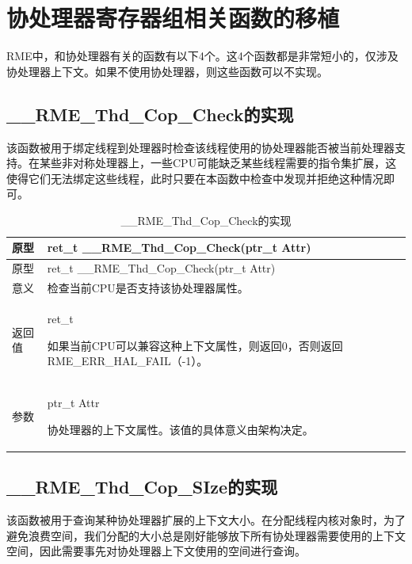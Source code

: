 \section{协处理器寄存器组相关函数的移植}\label{sec:7-coprocessor-register-set-function-porting}

RME中，和协处理器有关的函数有以下4个。这4个函数都是非常短小的，仅涉及协处理器上下文。如果不使用协处理器，则这些函数可以不实现。

\subsection{\_\_RME\_Thd\_Cop\_Check的实现}\label{subsec:7-rme-thd-cop-check-implementation}

该函数被用于绑定线程到处理器时检查该线程使用的协处理器能否被当前处理器支持。在某些非对称处理器上，一些CPU可能缺乏某些线程需要的指令集扩展，这使得它们无法绑定这些线程，此时只要在本函数中检查中发现并拒绝这种情况即可。

\begin{xltabular}{\textwidth}{@{}>{\hsize\raggedright\arraybackslash}X>{\hsize\raggedright\arraybackslash}X@{}}
\caption{\_\_RME\_Thd\_Cop\_Check的实现}\label{tab:7-69-rme-thd-cop-check-implementation}\\
\toprule
原型 & ret\_t \_\_RME\_Thd\_Cop\_Check(ptr\_t Attr)\tabularnewline
\endfirsthead
\toprule
原型 & ret\_t \_\_RME\_Thd\_Cop\_Check(ptr\_t Attr)\tabularnewline
\midrule
\endhead
\bottomrule
\endlastfoot
意义 & 检查当前CPU是否支持该协处理器属性。\tabularnewline
返回值\strut
 & ret\_t

如果当前CPU可以兼容这种上下文属性，则返回0，否则返回 RME\_ERR\_HAL\_FAIL（-1）。\strut
\tabularnewline
参数\strut
 & ptr\_t Attr

协处理器的上下文属性。该值的具体意义由架构决定。\strut
\tabularnewline
\end{xltabular}

\subsection{\_\_RME\_Thd\_Cop\_SIze的实现}\label{subsec:7-rme-thd-cop-size-implementation}

该函数被用于查询某种协处理器扩展的上下文大小。在分配线程内核对象时，为了避免浪费空间，我们分配的大小总是刚好能够放下所有协处理器需要使用的上下文空间，因此需要事先对协处理器上下文使用的空间进行查询。

